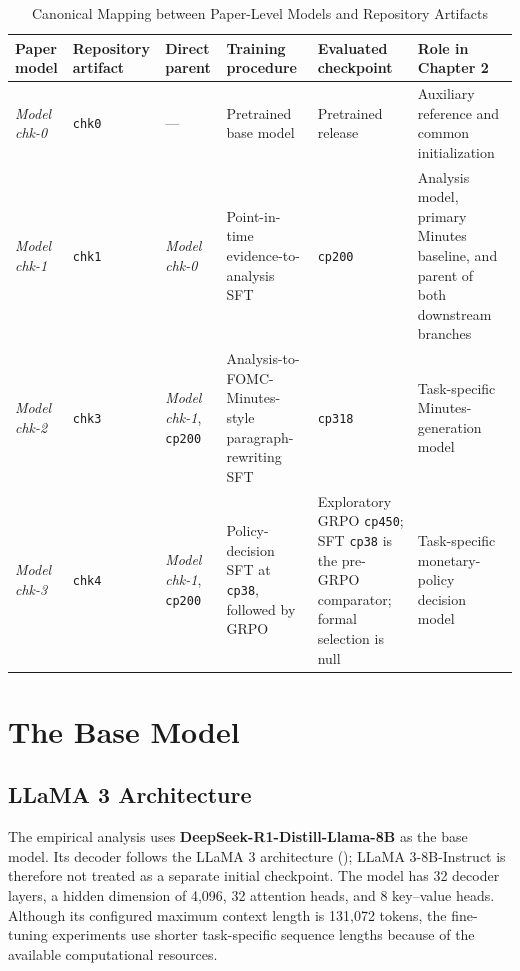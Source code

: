 \begin{table}[htbp]
    \centering
    \footnotesize
    \setlength{\tabcolsep}{2.5pt}
    \renewcommand{\arraystretch}{1.15}
    \begin{tabularx}{\textwidth}{@{}p{}p{}p{}Xp{}X@{}}
        \toprule
        \textbf{Paper model} & \textbf{Repository artifact} & \textbf{Direct parent} & \textbf{Training procedure} & \textbf{Evaluated checkpoint} & \textbf{Role in Chapter 2} \\
        \midrule
        \textit{Model chk-0} & \texttt{chk0} & --- & Pretrained base model & Pretrained release & Auxiliary reference and common initialization \\
        \textit{Model chk-1} & \texttt{chk1} & \textit{Model chk-0} & Point-in-time evidence-to-analysis SFT & \texttt{cp200} & Analysis model, primary Minutes baseline, and parent of both downstream branches \\
        \textit{Model chk-2} & \texttt{chk3} & \textit{Model chk-1}, \texttt{cp200} & Analysis-to-FOMC-Minutes-style paragraph-rewriting SFT & \texttt{cp318} & Task-specific Minutes-generation model \\
        \textit{Model chk-3} & \texttt{chk4} & \textit{Model chk-1}, \texttt{cp200} & Policy-decision SFT at \texttt{cp38}, followed by GRPO & Exploratory GRPO \texttt{cp450}; SFT \texttt{cp38} is the pre-GRPO comparator; formal selection is null & Task-specific monetary-policy decision model \\
        \bottomrule
    \end{tabularx}
    \caption{Canonical Mapping between Paper-Level Models and Repository Artifacts}
    \label{tab:ch2:model_checkpoints}
\end{table}





\section{The Base Model}\label{ch2:sec:base_model}



\subsection*{LLaMA 3 Architecture}
The empirical analysis uses \textbf{DeepSeek-R1-Distill-Llama-8B} as the base
model.  Its decoder follows the LLaMA 3 architecture
(\cite{meta2024llama3}); LLaMA 3-8B-Instruct is therefore not treated as a
separate initial checkpoint.  The model has 32 decoder layers, a hidden
dimension of 4,096, 32 attention heads, and 8 key--value heads.  Although its
configured maximum context length is 131,072 tokens, the fine-tuning
experiments use shorter task-specific sequence lengths because of the
available computational resources.


